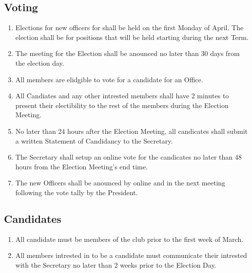 \documentclass[a4paper,12pt]{article}
\begin{document}
\subsection{Voting} \label{election-vote}
\begin{enumerate}
  \item \label{elec-time} Elections for new officers for shall be held on the first Monday of April. The election shall be for positions that will be held starting during the next Term.
  \item The meeting for the Election shall be anounced no later than 30 days from the election day.
  \item All members are elidgible to vote for a candidate for an Office.
  \item All Candiates and any other intrested members shall have 2 minutes to present their electibility to the rest of the members during the Election Meeting.
  \item No later than 24 hours after the Election Meeting, all candicates shall submit a written Statement of Candidancy to the Secretary.
  \item The Secretary shall setup an online vote for the candicates no later than 48 hours from the Election Meeting's end time.
  \item The new Officers shall be anounced by online and in the next meeting following the vote tally by the President.
\end{enumerate}

\subsection{Candidates}
\begin{enumerate}
  \item All candidate must be members of the club prior to the first week of March.
  \item All members intrested in to be a candidate must communicate their intrested with the Secretary no later than 2 weeks prior to the Election Day.
\end{enumerate}
\end{document}
